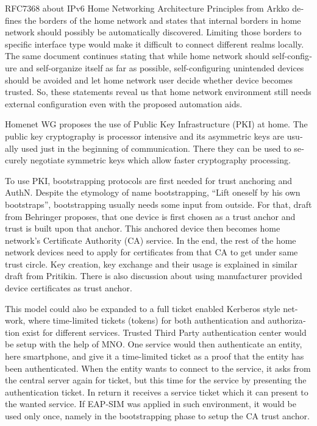 \documentclass[12pt,a4paper,english]{tutthesis}
\begin{document}
\begin{otherlanguage}{english}
RFC7368 about IPv6 Home Networking Architecture Principles from
Arkko\cite{rfc7368} defines the borders of the home network and states that
internal borders in home network should possibly be automatically
discovered. Limiting those borders to specific
interface type would make it difficult to connect different realms locally.
The same document continues stating
that while home network should self-configure and self-organize itself as
far as possible, self-configuring unintended devices should be
avoided and let home network user decide whether device becomes trusted.
So, these statements reveal us that home network environment still needs
external configuration even with the proposed automation aids.





Homenet WG proposes the use of Public Key Infrastructure (PKI) at 
home. The public key cryptography is processor intensive and its
asymmetric keys are usually used just in the beginning of
communication. There they can be used to securely negotiate symmetric
keys which allow faster cryptography processing.

To use PKI, bootstrapping protocols are first needed for trust
anchoring and AuthN.  Despite the etymology of name bootstrapping,
``Lift oneself by his own bootstraps'', bootstrapping usually needs
some input from outside.
For that, draft from Behringer\cite{draft-behringer-bootstrap} proposes,
that one device is first chosen as a trust anchor and trust is
built upon that anchor. This anchored device then becomes home network's
Certificate Authority (CA) service. In the end, the rest of the home network 
devices need to apply for certificates from that CA to get under same
trust circle.
Key creation, key exchange and their usage is explained in similar
draft from Pritikin\cite{draft-pritikin-bootstrap}. There is also discussion about using
manufacturer provided device certificates as trust anchor.  



This model could also be expanded to a full ticket enabled
Kerberos style network, where time-limited tickets (tokens) for
both authentication and authorization exist for different services. Trusted
Third Party authentication center would be setup with the help of MNO.
One service would then authenticate an entity, here smartphone, and
give it a time-limited ticket as a proof that the entity has been authenticated.
When the entity wants to connect to the service, it asks from the central 
server again for ticket, but this time for the service by presenting
the authentication ticket. In return it receives a service ticket which
it can present to the wanted service. 
If EAP-SIM was applied in such environment, it would be used only once, namely in
the bootstrapping phase to setup the CA trust anchor.  







\end{otherlanguage}
\end{document}
